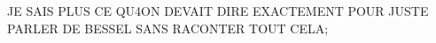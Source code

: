 


        JE SAIS PLUS CE QU4ON DEVAIT DIRE EXACTEMENT POUR JUSTE PARLER DE BESSEL SANS RACONTER TOUT CELA;


